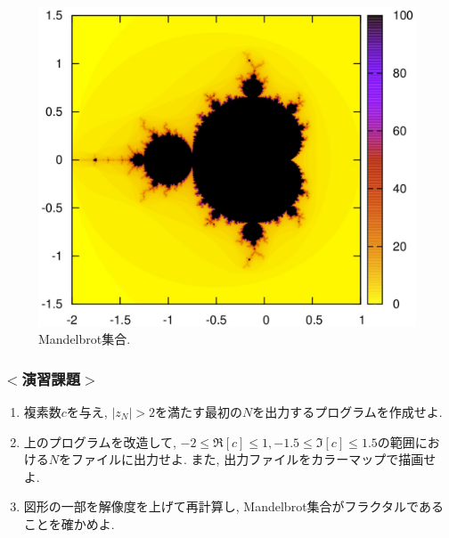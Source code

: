 \documentclass[a4j]{jsarticle}
\begin{document}
\begin{figure}[ht]
\centering
\includegraphics[width=0.75\linewidth]{source/figure/mandel.eps}
\caption{Mandelbrot集合. }
\end{figure}

\subsubsection*{$<$演習課題$>$}
\begin{enumerate}
\item 複素数$c$を与え, $|z_N|>2$を満たす最初の$N$を出力するプログラムを作成せよ. 
\item 上のプログラムを改造して, $-2 \le \Re[c] \le 1, -1.5 \le \Im[c] \le 1.5$の範囲における$N$をファイルに出力せよ. 
また, 出力ファイルをカラーマップで描画せよ. 
\item 図形の一部を解像度を上げて再計算し, Mandelbrot集合がフラクタルであることを確かめよ. 
\end{enumerate}
\end{document}
